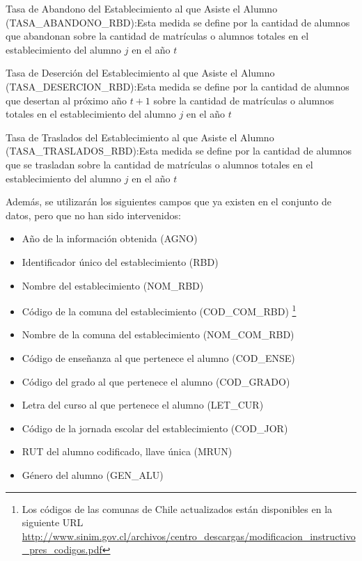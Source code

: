 \begin{longdescription}
\begin{longdescription}
              \item[Tasa de Abandono del Establecimiento al que Asiste el Alumno](TASA\_ABANDONO\_RBD):Esta medida se define por la cantidad de alumnos que abandonan sobre la cantidad de matrículas o alumnos totales en el establecimiento del alumno $j$ en el año $t$
              \item[Tasa de Deserción del Establecimiento al que Asiste el Alumno](TASA\_DESERCION\_RBD):Esta medida se define por la cantidad de alumnos que desertan al próximo año $t+1$ sobre la cantidad de matrículas o alumnos totales en el establecimiento del alumno $j$ en el año $t$
              \item[Tasa de Traslados del Establecimiento al que Asiste el Alumno](TASA\_TRASLADOS\_RBD):Esta medida se define por la cantidad de alumnos que se trasladan sobre la cantidad de matrículas o alumnos totales en el establecimiento del alumno $j$ en el año $t$
            \end{longdescription}
        Además, se utilizarán los siguientes campos que ya existen en el conjunto de datos, pero que no han sido intervenidos:
            \begin{itemize}
              \item Año de la información obtenida (AGNO)
              \item Identificador único del establecimiento (RBD)
              \item Nombre del establecimiento (NOM\_RBD)
              \item Código de la comuna del establecimiento (COD\_COM\_RBD)
              \footnote{Los códigos de las comunas de Chile actualizados están disponibles en la siguiente URL \url{http://www.sinim.gov.cl/archivos/centro_descargas/modificacion_instructivo_pres_codigos.pdf}}
              \item Nombre de la comuna del establecimiento (NOM\_COM\_RBD)
              \item Código de enseñanza al que pertenece el alumno (COD\_ENSE)
              \item Código del grado al que pertenece el alumno (COD\_GRADO)
              \item Letra del curso al que pertenece el alumno (LET\_CUR)
              \item Código de la jornada escolar del establecimiento (COD\_JOR)
              \item RUT del alumno codificado, llave única (MRUN)
              \item Género del alumno (GEN\_ALU)

\end{itemize}
\end{longdescription}
